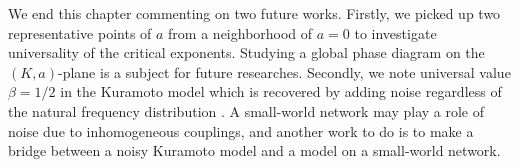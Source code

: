 



We end this chapter commenting on two future works.
Firstly,
we picked up two representative points of $a$ from a neighborhood of $a=0$
to investigate universality of the critical exponents.
Studying a global phase diagram on the $(K,a)$-plane is a subject for future researches.
Secondly, we note universal value $\beta=1/2$ in the Kuramoto model
which is recovered by adding noise regardless of the natural
frequency distribution \cite{sakaguchi1988}.
A small-world network may play a role of noise due to
inhomogeneous couplings,
and another work to do is to make a bridge between a noisy Kuramoto model
and a model on a small-world network.




